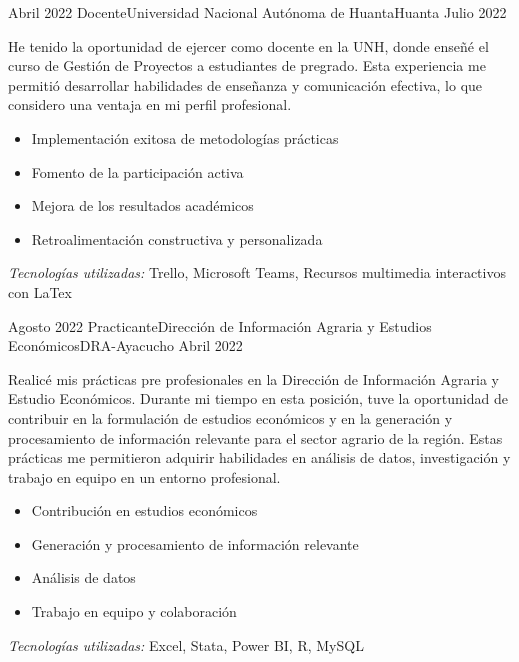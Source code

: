 
\begin{experiences}

  \experience
  {Abril 2022}    {Docente}{Universidad Nacional Autónoma de Huanta}{Huanta}
  {Julio 2022}   {
    He tenido la oportunidad de ejercer como docente en la UNH, donde enseñé el curso de Gestión de Proyectos a estudiantes de pregrado. Esta experiencia me permitió desarrollar habilidades de enseñanza y comunicación efectiva, lo que considero una ventaja en mi perfil profesional.
    \begin{itemize}
      \item Implementación exitosa de metodologías prácticas
      \item Fomento de la participación activa
      \item Mejora de los resultados académicos
      \item Retroalimentación constructiva y personalizada
    \end{itemize}
  }
  {\footnotesize{\emph{Tecnologías utilizadas:} Trello, Microsoft Teams, Recursos multimedia interactivos con LaTex}}
  \emptySeparator

  \experience
  {Agosto 2022}    {Practicante}{Dirección de Información Agraria y Estudios Económicos}{DRA-Ayacucho}
  {Abril 2022}   {
    Realicé mis prácticas pre profesionales en la Dirección de Información Agraria y Estudio Económicos. Durante mi tiempo en esta posición, tuve la oportunidad de contribuir en la formulación de estudios económicos y en la generación y procesamiento de información relevante para el sector agrario de la región. Estas prácticas me permitieron adquirir habilidades en análisis de datos, investigación y trabajo en equipo en un entorno profesional.
    \begin{itemize}
      \item Contribución en estudios económicos
      \item Generación y procesamiento de información relevante
      \item Análisis de datos
      \item Trabajo en equipo y colaboración
    \end{itemize}
  }
  {\footnotesize{\emph{Tecnologías utilizadas:} Excel, Stata, Power BI, R, MySQL}}
  \emptySeparator


\end{experiences}
